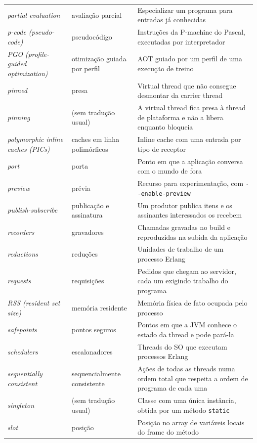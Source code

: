 \begin{longtable}{@{}>{\raggedright}p{3.9cm} >{\raggedright}p{3.6cm} >{\raggedright\arraybackslash}p{6.3cm}@{}}
\textit{partial evaluation} & avaliação parcial & Especializar um programa para entradas já conhecidas \\
\textit{p-code (pseudo-code)} & pseudocódigo & Instruções da P-machine do Pascal, executadas por interpretador \\
\textit{PGO (profile-guided optimization)} & otimização guiada por perfil & AOT guiado por um perfil de uma execução de treino \\
\textit{pinned} & presa & Virtual thread que não consegue desmontar da carrier thread \\
\textit{pinning} & (sem tradução usual) & A virtual thread fica presa à thread de plataforma e não a libera enquanto bloqueia \\
\textit{polymorphic inline caches (PICs)} & caches em linha polimórficos & Inline cache com uma entrada por tipo de receptor \\
\textit{port} & porta & Ponto em que a aplicação conversa com o mundo de fora \\
\textit{preview} & prévia & Recurso para experimentação, com \texttt{-{}-enable-preview} \\
\textit{publish-subscribe} & publicação e assinatura & Um produtor publica itens e os assinantes interessados os recebem \\
\textit{recorders} & gravadores & Chamadas gravadas no build e reproduzidas na subida da aplicação \\
\textit{reductions} & reduções & Unidades de trabalho de um processo Erlang \\
\textit{requests} & requisições & Pedidos que chegam ao servidor, cada um exigindo trabalho do programa \\
\textit{RSS (resident set size)} & memória residente & Memória física de fato ocupada pelo processo \\
\textit{safepoints} & pontos seguros & Pontos em que a JVM conhece o estado da thread e pode pará-la \\
\textit{schedulers} & escalonadores & Threads do SO que executam processos Erlang \\
\textit{sequentially consistent} & sequencialmente consistente & Ações de todas as threads numa ordem total que respeita a ordem de programa de cada uma \\
\textit{singleton} & (sem tradução usual) & Classe com uma única instância, obtida por um método \texttt{static} \\
\textit{slot} & posição & Posição no array de variáveis locais do frame do método \\

\end{longtable}
